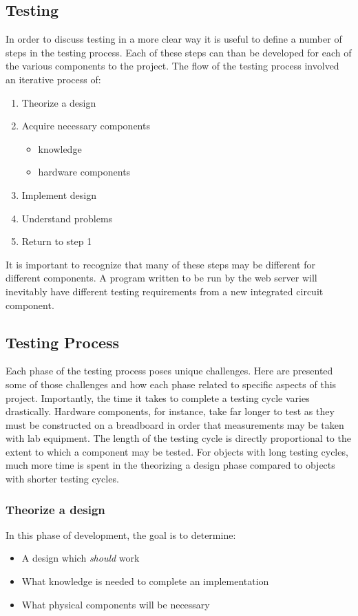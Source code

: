 \documentclass{article}	%
\begin{document}
\begin{multicols}{2}
\section{Testing}
In order to discuss testing in a more clear way
it is useful to define a number of steps
in the testing process.
Each of these steps can than be developed for
each of the various components to the project.
%
The flow of the testing process
involved an iterative process of:
\begin{enumerate}
\item Theorize a design
\item Acquire necessary components
    \begin{itemize}
    \item knowledge
    \item hardware components
    \end{itemize}
\item Implement design
\item Understand problems
\item Return to step 1
\end{enumerate}
%
It is important to recognize that many
of these steps may be different for different components.
A program written to be run by the web server
will inevitably have different testing requirements from
a new integrated circuit component.

\subsection{Testing Process}
Each phase of the testing process poses unique challenges.
Here are presented some of those challenges and
how each phase related to specific aspects of this project.
Importantly, the time it takes to complete a 
testing cycle varies drastically.
Hardware components, for instance, take far longer to test
as they must be constructed on a breadboard in order that 
measurements may be taken with lab equipment.
%
The length of the testing cycle is 
directly proportional to the extent to
which a component may be tested.
%
For objects with long testing cycles,
much more time is spent in the 
theorizing a design phase compared to
objects with shorter testing cycles.

\subsubsection{Theorize a design}
In this phase of development,
the goal is to determine:
\begin{itemize}
\item A design which \emph{should} work
\item What knowledge is needed to complete an implementation
\item What physical components will be necessary
\end{itemize}


\end{multicols}
\end{document}
